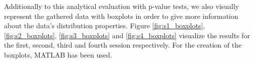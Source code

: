 \begin{table}[H]
\centering
{}
\caption{\textit{The determined p-values on all testing variables and sessions, between Ambiguation Plots and mean values.}}
\label{table:kruskal_Ambiguation_Mean}
\end{table}

Additionally to this analytical evaluation with p-value tests, we also visually represent the gathered data with boxplots in order to give more information about the data's distribution properties. Figure \ref{fig:s1_boxplots}, \ref{fig:s2_boxplots}, \ref{fig:s3_boxplots} and \ref{fig:s4_boxplots} visualize the results for the first, second, third and fourth session respectively. For the creation of the boxplots, MATLAB \cite{MATLAB:2013} has been used.

